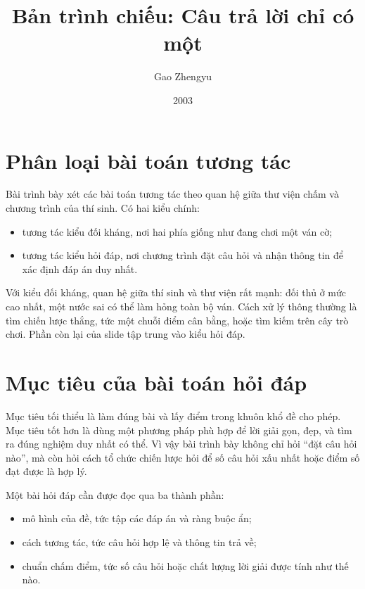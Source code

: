 \documentclass[11pt]{article}
\title{Bản trình chiếu: Câu trả lời chỉ có một}
\author{Gao Zhengyu}
\date{2003}
\begin{document}
\maketitle


\section{Phân loại bài toán tương tác}

Bài trình bày xét các bài toán tương tác theo quan hệ giữa thư viện chấm và
chương trình của thí sinh. Có hai kiểu chính:
\begin{itemize}
  \item tương tác kiểu đối kháng, nơi hai phía giống như đang chơi một ván
  cờ;
  \item tương tác kiểu hỏi đáp, nơi chương trình đặt câu hỏi và nhận thông
  tin để xác định đáp án duy nhất.
\end{itemize}

Với kiểu đối kháng, quan hệ giữa thí sinh và thư viện rất mạnh: đối thủ ở
mức cao nhất, một nước sai có thể làm hỏng toàn bộ ván. Cách xử lý thông
thường là tìm chiến lược thắng, tức một chuỗi điểm cân bằng, hoặc tìm kiếm
trên cây trò chơi. Phần còn lại của slide tập trung vào kiểu hỏi đáp.

\section{Mục tiêu của bài toán hỏi đáp}

Mục tiêu tối thiểu là làm đúng bài và lấy điểm trong khuôn khổ đề cho phép.
Mục tiêu tốt hơn là dùng một phương pháp phù hợp để lời giải gọn, đẹp, và
tìm ra đúng nghiệm duy nhất có thể. Vì vậy bài trình bày không chỉ hỏi
``đặt câu hỏi nào'', mà còn hỏi cách tổ chức chiến lược hỏi để số câu hỏi
xấu nhất hoặc điểm số đạt được là hợp lý.

Một bài hỏi đáp cần được đọc qua ba thành phần:
\begin{itemize}
  \item mô hình của đề, tức tập các đáp án và ràng buộc ẩn;
  \item cách tương tác, tức câu hỏi hợp lệ và thông tin trả về;
  \item chuẩn chấm điểm, tức số câu hỏi hoặc chất lượng lời giải được tính
  như thế nào.
\end{itemize}
\end{document}
